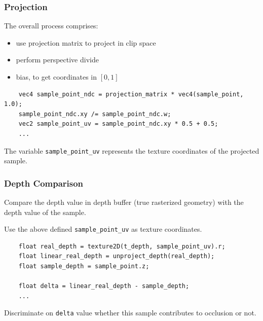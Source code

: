 \documentclass{beamer}
\begin{document}
\begin{frame}[fragile]
\frametitle{Projection}
The overall process comprises:
\begin{itemize}
    \item use projection matrix to project in clip space
    \item perform perspective divide
    \item bias, to get coordinates in $ [0,1] $
\end{itemize}

\begin{verbatim}
    vec4 sample_point_ndc = projection_matrix * vec4(sample_point, 1.0);
    sample_point_ndc.xy /= sample_point_ndc.w;
    vec2 sample_point_uv = sample_point_ndc.xy * 0.5 + 0.5;
    ...
\end{verbatim}

The variable \verb|sample_point_uv| represents the texture coordinates of the projected sample.

\end{frame}

\begin{frame}[fragile]
\frametitle{Depth Comparison}
Compare the depth value in depth buffer (true rasterized geometry) with the depth value of the sample.

Use the above defined \verb|sample_point_uv| as texture coordinates.

\begin{verbatim}
    float real_depth = texture2D(t_depth, sample_point_uv).r;
    float linear_real_depth = unproject_depth(real_depth);
    float sample_depth = sample_point.z;
    
    float delta = linear_real_depth - sample_depth;
    ...
\end{verbatim}

Discriminate on \verb|delta| value whether this sample contributes to occlusion or not.
\end{frame}
\end{document}

